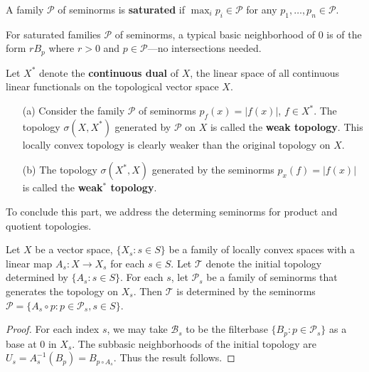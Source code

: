 \begin{definition}
A family $\mathscr{P}$ of seminorms is \textbf{saturated} if $\max_ip_i\in\mathscr{P}$ for any $p_1,\dots,p_n\in\mathscr{P}$.
\end{definition}
For saturated families $\mathscr{P}$ of seminorms, a typical basic neighborhood of $0$ is of the form $rB_p$ where $r>0$ and $p\in\mathscr{P}$---no intersections needed.
\begin{example}\label{weak topo wea-star topo def}
Let $X^*$ denote the \textbf{continuous dual} of $X$, the linear space of all continuous linear functionals on the topological vector space $X$.
\begin{itemize}
\item[(a)] Consider the family $\mathscr{P}$ of seminorms $p_f(x)=|f(x)|$, $f\in X^*$. The topology $\sigma(X,X^*)$ generated by $\mathscr{P}$ on $X$ is called the \textbf{weak topology}. This locally convex topology is clearly weaker than the original topology on $X$.
\item[(b)] The topology $\sigma(X^*,X)$ generated by the seminorms $p_x(f)=|f(x)|$ is called the \textbf{weak$^*$ topology}.
\end{itemize}
\end{example}
To conclude this part, we address the determing seminorms for product and quotient topologies.
\begin{proposition}\label{LCS initial topo seminorm}
Let $X$ be a vector space, $\{X_s:s\in S\}$ be a family of locally convex spaces with a linear map $A_s:X\to X_s$ for each $s\in S$. Let $\mathcal{T}$ denote the initial topology determined by $\{A_s:s\in S\}$. For each $s$, let $\mathscr{P}_s$ be a family of seminorms that generates the topology on $X_s$. Then $\mathcal{T}$ is determined by the seminorms $\mathscr{P}=\{A_s\circ p:p\in\mathscr{P}_s,s\in S\}$.
\end{proposition}
\begin{proof}
For each index $s$, we may take $\mathcal{B}_s$ to be the filterbase $\{B_p:p\in\mathscr{P}_s\}$ as a base at $0$ in $X_s$. The subbasic neighborhoods of the initial topology are $U_s=A_s^{-1}(B_p)=B_{p\circ A_s}$. Thus the result follows.
\end{proof}
